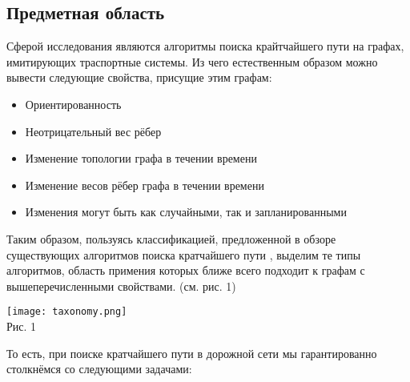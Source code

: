 \documentclass[12pt]{article}
\begin{document}
\subsection{Предметная область}

Сферой исследования являются алгоритмы поиска крайтчайшего пути на графах, имитирующих траспортные системы. Из чего естественным образом можно вывести следующие свойства, присущие этим графам:

\begin{itemize}
  \item Ориентированность
  \item Неотрицательный вес рёбер
  \item Изменение топологии графа в течении времени
  \item Изменение весов рёбер графа в течении времени
  \item Изменения могут быть как случайными, так и запланированными
\end{itemize}

Таким образом, пользуясь классификацией, предложенной в обзоре существующих алгоритмов поиска кратчайшего пути \cite{survey}, выделим те типы алгоритмов, область примения которых ближе всего подходит к графам с вышеперечисленными свойствами. (см. рис. 1)

\begin{center}
  \texttt{[image: taxonomy.png]} \\
  Рис. 1
\end{center}

То есть, при поиске кратчайшего пути в дорожной сети мы гарантированно столкнёмся со следующими задачами:
\end{document}
